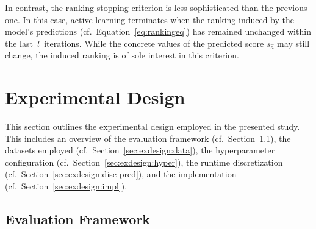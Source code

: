 \documentclass[sn-basic, Numbered]{sn-jnl} %
\begin{document}
In contrast, the ranking stopping criterion is less sophisticated than the previous one.
In this case, active learning terminates when the ranking induced by the model's predictions (cf.~Equation~\eqref{eq:rankingeq}) has remained unchanged within the last~$l$~iterations.
While the concrete values of the predicted score $s_{\hat a}$ may still change, the induced ranking is of sole interest in this criterion.

\section{Experimental Design}
\label{sec:exdesign}

This section outlines the experimental design employed in the presented study.
This includes an overview of the evaluation framework (cf.~Section~\ref{sec:exdesign:eval}), the datasets employed (cf.~Section~\ref{sec:exdesign:data}), the hyperparameter configuration (cf.~Section~\ref{sec:exdesign:hyper}), the runtime discretization (cf.~Section~\ref{sec:exdesign:disc-pred}), and the implementation (cf.~Section~\ref{sec:exdesign:impl}).

\subsection{Evaluation Framework}
\label{sec:exdesign:eval}
\end{document}
